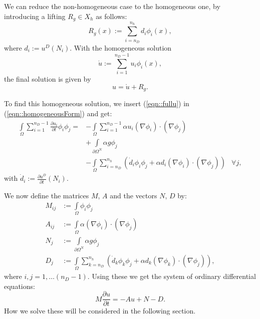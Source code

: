 We can reduce the non-homogeneous case to the homogeneous one, by introducing a lifting $R_g\in X_h$ as follows:
\begin{equation*}
        R_g(x) := \sum_{i=n_D}^{n_h}d_i \phi_i(x),
\end{equation*}
where $d_i:=u^D(N_i)$. With the homogeneous solution
\begin{equation*}
        \mathring{u} := \sum_{i=1}^{n_D-1}u_i \phi_i(x),
\end{equation*}
the final solution is given by
\begin{equation}
        \label{eqn::fullu}
        u = \mathring{u} + R_g.
\end{equation}


To find this homogeneous solution, we insert (\ref{eqn::fullu}) in (\ref{eqn::homogeneousForm}) and get:
\begin{equation}
\label{eqn::finalDiscreticedForm}
\begin{aligned}
        \int\limits_{\Omega} \sum_{i=1}^{n_D-1} \frac{\partial u_i}{\partial t} \phi_i \phi_j = &-\int\limits_{\Omega} \sum_{i=1}^{n_D-1} \alpha u_i(\nabla \phi_i) \cdot (\nabla \phi_j) \\
        &+ \int\limits_{\partial\Omega^N} \alpha g\phi_j \\
        &-        \int\limits_{\Omega} \sum_{i=n_D}^{n_h}\left( \dot{d}_i \phi_i \phi_j  + \alpha d_i(\nabla \phi_i) \cdot (\nabla \phi_j)\right)
         & \forall j,
\end{aligned}
\end{equation}
with $\dot{d}_i:=\frac{\partial u^D}{\partial t}(N_i)$.

We now define the matrices $M$, $A$ and the vectors $N$, $D$ by:
\begin{align*}
        M_{ij} &:=\int\limits_{\Omega} \phi_i \phi_j \\
        A_{ij} &:=\int\limits_{\Omega} \alpha (\nabla \phi_i) \cdot (\nabla \phi_j) \\
        N_{j} &:=\int\limits_{\partial\Omega^N} \alpha g\phi_j \\
        D_{j} &:=\int\limits_{\Omega} \sum_{k=n_D}^{n_h}\left( \dot{d}_k \phi_k \phi_j  + \alpha d_k(\nabla \phi_k) \cdot (\nabla \phi_j)\right),
\end{align*}
where $i,j=1,\dots (n_D-1)$. Using these we get the system of ordinary differential equations:
\begin{equation}
        \label{eqn::matrixForm}
        M\frac{\partial u}{\partial t} = -A u + N - D.
\end{equation}
How we solve these will be considered in the following section.

